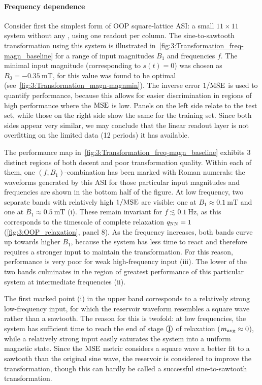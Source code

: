 \paragraph{Frequency dependence}
Consider first the simplest form of OOP square-lattice ASI: a small $11 \times 11$ system without any , using one readout per column.
The sine-to-sawtooth transformation using this system is illustrated in~\cref{fig:3:Transformation_freq-magn_baseline} for a range of input magnitudes $B_1$ and frequencies $f$.
The minimal input magnitude (corresponding to $s(t) = 0$) was chosen as $B_0 = \SI{-0.35}{\milli\tesla}$, for this value was found to be optimal (see~\cref{fig:3:Transformation_magn-magnmin}).
The inverse error $1/\mathrm{MSE}$ is used to quantify performance, because this allows for easier discrimination in regions of high performance where the $\mathrm{MSE}$ is low.
Panels on the left side relate to the test set, while those on the right side show the same for the training set.
Since both sides appear very similar, we may conclude that the linear readout layer is not overfitting on the limited data (12 periods) it has available. \par
The performance map in~\cref{fig:3:Transformation_freq-magn_baseline} exhibits 3 distinct regions of both decent and poor transformation quality.
Within each of them, one $(f, B_1)$-combination has been marked with Roman numerals: the waveforms generated by this ASI for those particular input magnitudes and frequencies are shown in the bottom half of the figure.
At low frequency, two separate bands with relatively high $1/\mathrm{MSE}$ are visible: one at $B_1 \approx \SI{0.1}{\milli\tesla}$  and one at $B_1 \approx \SI{0.5}{\milli\tesla}$ \textsf{(i)}.
These remain invariant for $f \lesssim \SI{0.1}{\hertz}$, as this corresponds to the timescale of complete relaxation $q_\mathrm{NN} = 1$ (\cref{fig:3:OOP_relaxation}, panel 8).
As the frequency increases, both bands curve up towards higher $B_1$, because the system has less time to react and therefore requires a stronger input to maintain the transformation.
For this reason, performance is very poor for weak high-frequency input \textsf{(iii)}.
The lower of the two bands culminates in the region of greatest performance of this particular system at intermediate frequencies \textsf{(ii)}. \par %
The first marked point \textsf{(i)} in the upper band corresponds to a relatively strong low-frequency input, for which the reservoir waveform resembles a square wave rather than a sawtooth.
The reason for this is twofold: at low frequencies, the system has sufficient time to reach the end of stage $\circled{1}$ of relaxation ($m_\mathrm{avg} \approx 0$), while a relatively strong input easily saturates the system into a uniform magnetic state. %
Since the $\mathrm{MSE}$ metric considers a square wave a better fit to a sawtooth than the original sine wave, the reservoir is considered to improve the transformation, though this can hardly be called a successful sine-to-sawtooth transformation.

